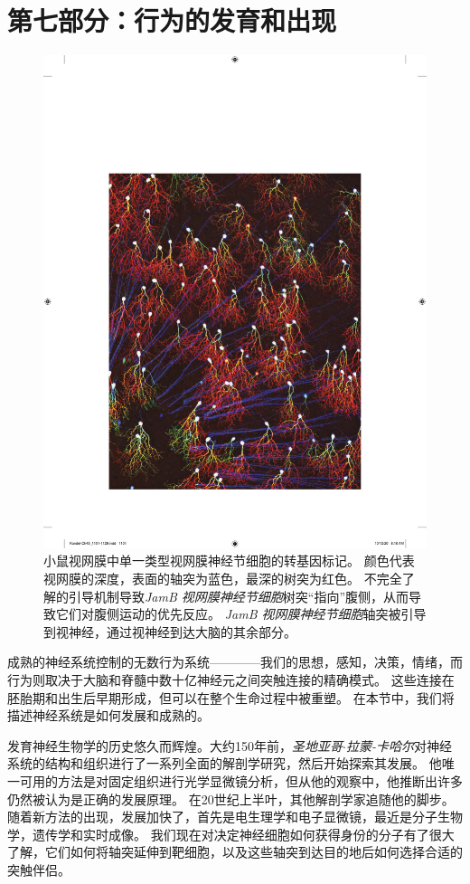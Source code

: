 \chapter*{第七部分：行为的发育和出现}

\begin{figure}[htbp]
	\centering
	\includegraphics[width=0.95\linewidth]{chap45/fig_45_0}
	\caption{小鼠视网膜中单一类型视网膜神经节细胞的转基因标记。
		颜色代表视网膜的深度，表面的轴突为蓝色，最深的树突为红色。
		不完全了解的引导机制导致\textit{JamB 视网膜神经节细胞}树突“指向”腹侧，从而导致它们对腹侧运动的优先反应。
		\textit{JamB 视网膜神经节细胞}轴突被引导到视神经，通过视神经到达大脑的其余部分。}
	\label{fig:45_0}
\end{figure}


成熟的神经系统控制的无数行为系统————我们的思想，感知，决策，情绪，而行为则取决于大脑和脊髓中数十亿神经元之间突触连接的精确模式。
这些连接在胚胎期和出生后早期形成，但可以在整个生命过程中被重塑。
在本节中，我们将描述神经系统是如何发展和成熟的。


发育神经生物学的历史悠久而辉煌。大约150年前，\textit{圣地亚哥$\cdot$拉蒙-卡哈尔}对神经系统的结构和组织进行了一系列全面的解剖学研究，然后开始探索其发展。
他唯一可用的方法是对固定组织进行光学显微镜分析，但从他的观察中，他推断出许多仍然被认为是正确的发展原理。
在20世纪上半叶，其他解剖学家追随他的脚步。随着新方法的出现，发展加快了，首先是电生理学和电子显微镜，最近是分子生物学，遗传学和实时成像。
我们现在对决定神经细胞如何获得身份的分子有了很大了解，它们如何将轴突延伸到靶细胞，以及这些轴突到达目的地后如何选择合适的突触伴侣。


